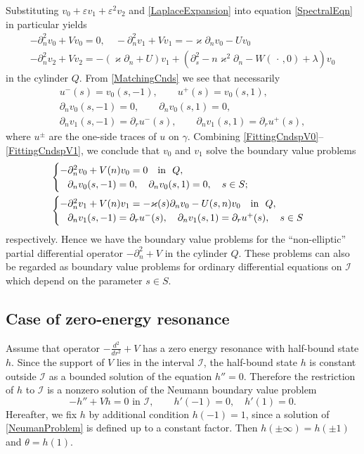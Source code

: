 \documentclass[reqno]{amsart}
\theoremstyle{plain}
\numberwithin{equation}{section}
\renewcommand{\kappa}{\varkappa}
\newcommand{\eps}{\varepsilon}
\newcommand{\cI}{\mathcal{I}}
\newcommand{\pte}{\partial_n}
\begin{document}
Substituting $v_0+\eps v_1+\eps^2 v_2$ and \eqref{LaplaceExpansion} into  equation \eqref{SpectralEqn} in particular yields
\begin{gather}\label{EqnsV0V1}
-\pte^2 v_0+Vv_0=0,
\quad
-\pte^2 v_1+Vv_1=-\kappa\pte v_0-Uv_0\\\label{EqnV2}
 -\pte^2 v_2+Vv_2=-(\kappa\pte +U) v_1
  +(\partial^2_s-n\kappa^2\partial_n-W(\,\cdot\,,0)+\lambda)v_0
\end{gather}
in the cylinder $Q$.
From \eqref{MatchingCnds} we see that necessarily
\begin{gather}\label{FittingCndsUV0}
 u^-(s)=v_0(s,-1),\qquad u^+(s)=v_0(s,1),
 \\\label{FittingCndspV0}
 \partial_n v_0(s,- 1)=0, \qquad \partial_n v_0(s, 1)=0, \\\label{FittingCndspV1}
 \partial_n v_1(s, -1)=\partial_r u^-(s), \qquad
 \partial_n v_1(s, 1)=\partial_r u^+(s),
\end{gather}
where $u^\pm$ are the one-side traces of $u$ on $\gamma$.
Combining \eqref{FittingCndspV0}--\eqref{FittingCndspV1}, we conclude that $v_0$ and $v_1$ solve the boundary value problems
\begin{align}\label{problemV0}
&\begin{cases}
  -\pte^2 v_0+V(n)v_0=0 \quad \hbox{in \ } Q, \\
    \phantom{-}\partial_n v_0(s,- 1)=0, \quad \partial_n v_0(s, 1)=0, \quad s\in S;
\end{cases}
\\\label{problemV1}
&\begin{cases}
  -\pte^2 v_1+V(n)v_1=-\kappa(s)\pte v_0-U(s,n)v_0\quad \hbox{in \ } Q, \\
    \phantom{-}\partial_n v_1(s, -1)=\partial_r u^-(s), \quad
\partial_n v_1(s, 1)=\partial_r u^+(s), \quad s\in S
\end{cases}
\end{align}
respectively. Hence we have the boundary value problems for the ``non-ellip\-tic'' partial differential operator $-\pte^2+V$ in the cylinder $Q$. These problems can also be  regarded as  boun\-da\-ry value problems for ordinary differential equations on $\cI$ which depend on the parameter $s\in S$.


\subsection{Case of zero-energy resonance}
Assume that operator $-\frac{d^2}{dr^2}+V$ has a zero energy resonance with half-bound state $h$. Since the support of $V$ lies in  the interval $\cI$, the half-bound state $h$ is  constant  outside $\cI$ as a bounded solution of the equation $h''=0$.
Therefore the restriction of $h$ to $\cI$ is a nonzero solution of the Neumann boundary value problem
\begin{equation}\label{NeumanProblem}
     -h''+Vh=0 \text{ \ in }\cI,\qquad   h'(-1)=0, \quad h'(1)=0.
\end{equation}
Hereafter, we fix $h$ by additional condition $h(-1)=1$, since a solution of \eqref{NeumanProblem} is defined up to a constant factor. Then $h(\pm\infty)=h(\pm 1)$ and $\theta=h(1)$.
\end{document}
